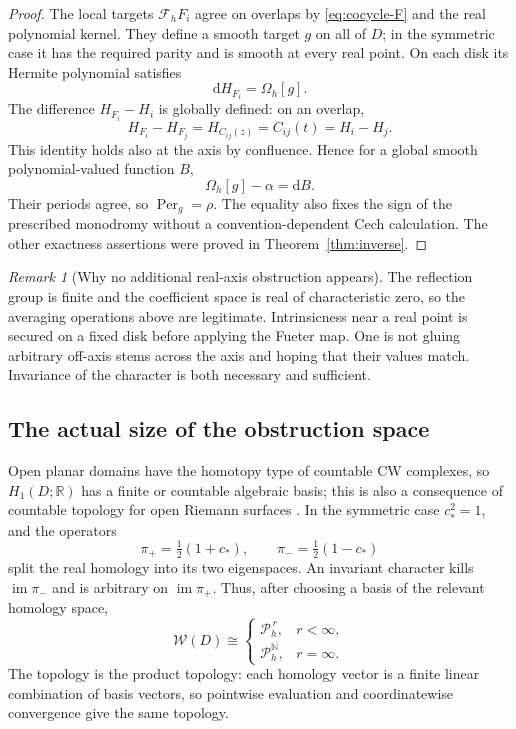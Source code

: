 \documentclass[11pt,a4paper]{article}
\numberwithin{equation}{section}
\theoremstyle{definition}
\theoremstyle{remark}
\newtheorem{remark}[theorem]{Remark}
\newcommand{\R}{\mathbb R}
\newcommand{\N}{\mathbb N}
\newcommand{\Fu}{\mathcal F_h}
\newcommand{\Pspace}{\mathscr P_h}
\newcommand{\Per}{\operatorname{Per}}
\newcommand{\calW}{\mathscr W}
\begin{document}
\begin{proof}
The local targets $\Fu F_i$ agree on overlaps by \eqref{eq:cocycle-F} and the
real polynomial kernel. They define a smooth target $g$ on all of $D$; in
the symmetric case it has the required parity and is smooth at every real
point. On each disk its Hermite polynomial satisfies
\[
 \mathrm dH_{F_i}=\Omega_h[g].
\]
The difference $H_{F_i}-H_i$ is globally defined: on an overlap,
\[
 H_{F_i}-H_{F_j}=H_{C_{ij}(z)}=C_{ij}(t)=H_i-H_j.
\]
This identity holds also at the axis by confluence. Hence for a global smooth
polynomial-valued function $B$,
\[
 \Omega_h[g]-\alpha=\mathrm dB.
\]
Their periods agree, so $\Per_g=\rho$. The equality also fixes the sign of
the prescribed monodromy without a convention-dependent Cech calculation.
The other exactness assertions were proved in Theorem~\ref{thm:inverse}.
\end{proof}

\begin{remark}[Why no additional real-axis obstruction appears]
The reflection group is finite and the coefficient space is real of
characteristic zero, so the averaging operations above are legitimate.
Intrinsicness near a real point is secured on a fixed disk before applying
the Fueter map. One is not gluing arbitrary off-axis stems across the axis
and hoping that their values match. Invariance of the character is both
necessary and sufficient.
\end{remark}

\subsection{The actual size of the obstruction space}

Open planar domains have the homotopy type of countable CW complexes, so
$H_1(D;\R)$ has a finite or countable algebraic basis; this is also a
consequence of countable topology for open Riemann surfaces \cite{forster}.
In the symmetric case $c_*^2=1$, and the operators
\[
 \pi_+=\tfrac12(1+c_*),\qquad \pi_-=\tfrac12(1-c_*)
\]
split the real homology into its two eigenspaces. An invariant character kills
$\operatorname{im}\pi_-$ and is arbitrary on $\operatorname{im}\pi_+$.
Thus, after choosing a basis of the relevant homology space,
\begin{equation}\label{eq:W-product}
 \calW(D)\cong
 \begin{cases}
  \Pspace^{\,r},&r<\infty,\\
  \Pspace^{\N},&r=\infty.
 \end{cases}
\end{equation}
The topology is the product topology: each homology vector is a finite linear
combination of basis vectors, so pointwise evaluation and coordinatewise
convergence give the same topology.
\end{document}

